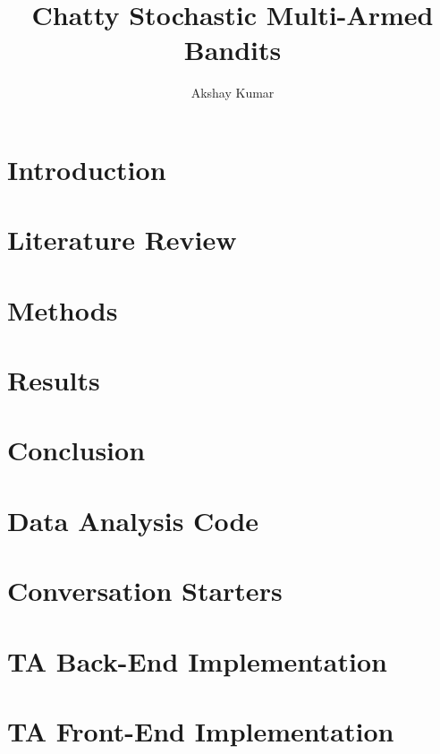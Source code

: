 \documentclass[12pt,lot,lof]{puthesis_undergraduate}
\title{Chatty Stochastic Multi-Armed Bandits}
\author{Akshay Kumar}
\let\savedbegincmd\begincmd
\let\begincmd\relax
\begin{document}
\savedbegincmd

\chapter{Introduction}
\label{ch:Introduction} 


\chapter{Literature Review}
\label{ch:LiteratureReview}


\chapter{Methods}
\label{ch:Methods}


\chapter{Results}
\label{ch:DataAnalysis}


\chapter{Conclusion}
\label{ch:Conclusion}


\appendix
\chapter{Data Analysis Code}
\label{app:DataAnalysisCode}


\chapter{Conversation Starters}
\label{app:ConversationStarters}


\chapter{TA Back-End Implementation}
\label{app:TABackendImplementation}


\chapter{TA Front-End Implementation}
\label{app:TAFrontendImplementation}




\end{document}
